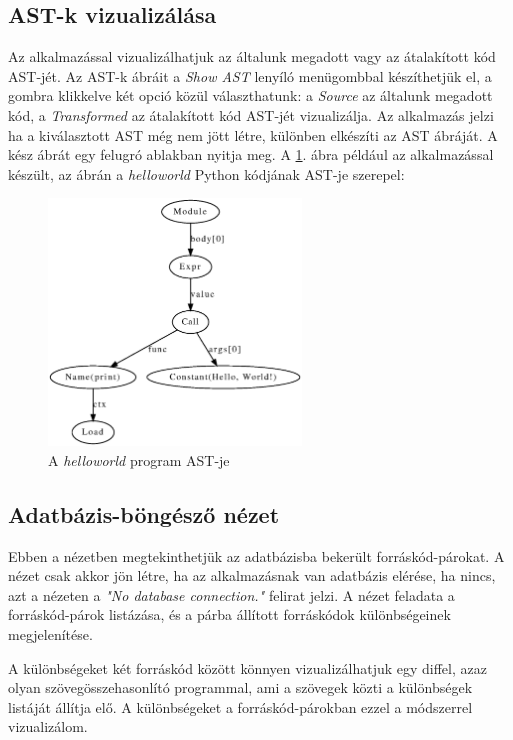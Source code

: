 \subsection{AST-k vizualizálása}

Az alkalmazással vizualizálhatjuk az általunk megadott vagy az átalakított kód AST-jét.
Az AST-k ábráit a \emph{Show AST} lenyíló menügombbal készíthetjük el, a gombra klikkelve két opció közül választhatunk:
a \emph{Source} az általunk megadott kód, a \emph{Transformed} az átalakított kód AST-jét vizualizálja.
Az alkalmazás jelzi ha a kiválasztott AST még nem jött létre, különben elkészíti az AST ábráját.
A kész ábrát egy felugró ablakban nyitja meg.
A \ref{fig:ast_example}. ábra például az alkalmazással készült, az ábrán a \emph{helloworld} Python kódjának AST-je szerepel:

\begin{figure}[H]
	\centering
	\includegraphics[width=0.6\textwidth]{images/figs/ast_graph.eps}
	\caption{\label{fig:ast_example}A \emph{helloworld} program AST-je}
\end{figure}

\subsection{Adatbázis-böngésző nézet}

Ebben a nézetben megtekinthetjük az adatbázisba bekerült forráskód-párokat.
A nézet csak akkor jön létre, ha az alkalmazásnak van adatbázis elérése,
ha nincs, azt a nézeten a \emph{"No database connection."} felirat jelzi.
A nézet feladata a forráskód-párok listázása, és a párba állított forráskódok
különbségeinek megjelenítése.

A különbségeket két forráskód között könnyen vizualizálhatjuk egy diffel,
azaz olyan szövegösszehasonlító programmal, ami a szövegek közti a különbségek
listáját állítja elő.
A különbségeket a forráskód-párokban ezzel a módszerrel vizualizálom.

